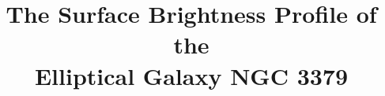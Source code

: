 
%
%

\title{The Surface Brightness Profile of the\\ Elliptical Galaxy NGC 3379}


%
%
%
%
%
%

\begin{PI}
\end{PI}



%

